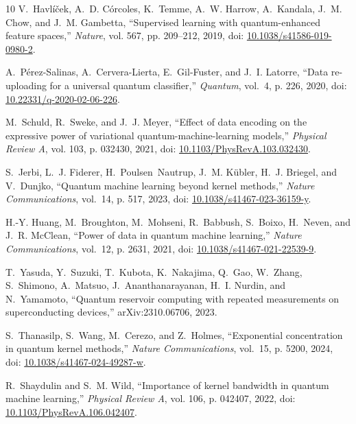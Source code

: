\documentclass[10pt,conference]{IEEEtran}
\begin{document}
\begin{thebibliography}{10}
V.~Havl{\'i}{\v{c}}ek, A.~D. C{\'o}rcoles, K.~Temme, A.~W. Harrow, A.~Kandala,
  J.~M. Chow, and J.~M. Gambetta, ``{Supervised learning with quantum-enhanced
  feature spaces},'' \emph{Nature}, vol. 567, pp. 209--212, 2019, doi:
  \href{https://doi.org/10.1038/s41586-019-0980-2}{10.1038/s41586-019-0980-2}.

A.~P{\'e}rez-Salinas, A.~Cervera-Lierta, E.~Gil-Fuster, and J.~I. Latorre,
  ``{Data re-uploading for a universal quantum classifier},'' \emph{Quantum},
  vol.~4, p. 226, 2020, doi:
  \href{https://doi.org/10.22331/q-2020-02-06-226}{10.22331/q-2020-02-06-226}.

M.~Schuld, R.~Sweke, and J.~J. Meyer, ``{Effect of data encoding on the
  expressive power of variational quantum-machine-learning models},''
  \emph{Physical Review A}, vol. 103, p. 032430, 2021, doi:
  \href{https://doi.org/10.1103/PhysRevA.103.032430}{10.1103/PhysRevA.103.032430}.

S.~Jerbi, L.~J. Fiderer, H.~Poulsen~Nautrup, J.~M. K{\"u}bler, H.~J. Briegel,
  and V.~Dunjko, ``{Quantum machine learning beyond kernel methods},''
  \emph{Nature Communications}, vol.~14, p. 517, 2023, doi:
  \href{https://doi.org/10.1038/s41467-023-36159-y}{10.1038/s41467-023-36159-y}.

H.-Y. Huang, M.~Broughton, M.~Mohseni, R.~Babbush, S.~Boixo, H.~Neven, and
  J.~R. McClean, ``{Power of data in quantum machine learning},'' \emph{Nature
  Communications}, vol.~12, p. 2631, 2021, doi:
  \href{https://doi.org/10.1038/s41467-021-22539-9}{10.1038/s41467-021-22539-9}.

T.~Yasuda, Y.~Suzuki, T.~Kubota, K.~Nakajima, Q.~Gao, W.~Zhang, S.~Shimono,
  A.~Matsuo, J.~Ananthanarayanan, H.~I. Nurdin, and N.~Yamamoto, ``{Quantum
  reservoir computing with repeated measurements on superconducting devices},''
  arXiv:2310.06706, 2023.

S.~Thanasilp, S.~Wang, M.~Cerezo, and Z.~Holmes, ``{Exponential concentration
  in quantum kernel methods},'' \emph{Nature Communications}, vol.~15, p. 5200,
  2024, doi:
  \href{https://doi.org/10.1038/s41467-024-49287-w}{10.1038/s41467-024-49287-w}.

R.~Shaydulin and S.~M. Wild, ``{Importance of kernel bandwidth in quantum
  machine learning},'' \emph{Physical Review A}, vol. 106, p. 042407, 2022,
  doi:
  \href{https://doi.org/10.1103/PhysRevA.106.042407}{10.1103/PhysRevA.106.042407}.


\end{thebibliography}
\end{document}
